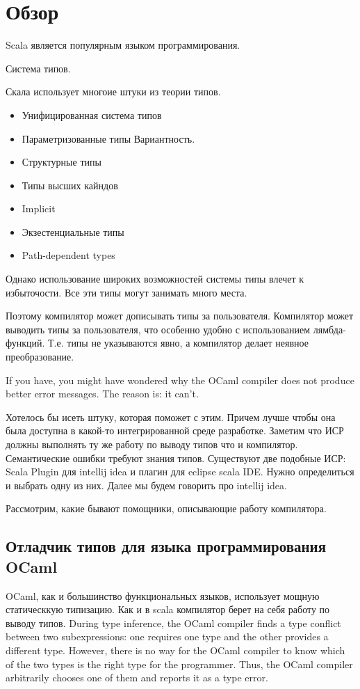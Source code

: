 \section{Обзор}

Scala является популярным языком программирования.

Система типов.

Скала использует многоие штуки из теории типов.
\begin{itemize}
  \item Унифицированная система типов
  \item Параметризованные типы
  Вариантность.
  \item Структурные типы
  \item Типы высших кайндов
  \item Implicit
  \item Экзестенциальные типы
  \item Path-dependent types
\end{itemize}

Однако использование широких возможностей системы типы влечет к избыточости.
Все эти типы могут занимать много места.

Поэтому компилятор может дописывать типы за пользователя.
Компилятор может выводить типы за пользователя, что особенно удобно с
использованием лямбда-функций.
Т.е. типы не указываются явно, а компилятор делает неявное преобразование.

If you have, you might have wondered why the OCaml compiler does not produce
better error messages. The reason is: it can't.

Хотелось бы исеть штуку, которая поможет с этим.
Причем лучше чтобы она была доступна в какой-то интегрированной среде разработке.
Заметим что ИСР должны выполнять ту же работу по выводу типов что и компилятор.
Семантические ошибки требуют знания типов.
Существуют две подобные ИСР: Scala Plugin для intellij idea и плагин для
eclipse scala IDE.
Нужно определиться и выбрать одну из них.
Далее мы будем говорить про intellij idea.

Рассмотрим, какие бывают помощники, описывающие работу компилятора.

\subsection{Отладчик типов для языка программирования OCaml}
\label{sec:ocaml}

OCaml, как и большинство функциональных языков, использует мощную статическкую
типизацию.
Как и в scala компилятор берет на себя работу по выводу типов.
During type inference, the OCaml compiler finds a type conflict between
two subexpressions: one requires one type and the other provides a different
type. However, there is no way for the OCaml compiler to know which of the two
types is the right type for the programmer. Thus, the OCaml compiler arbitrarily
chooses one of them and reports it as a type error.

